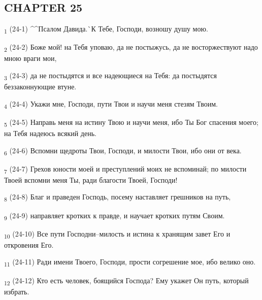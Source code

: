 \subsection{CHAPTER 25}
\begin{tcolorbox}
\textsubscript{1} (24-1) ^^Псалом Давида.^^ К Тебе, Господи, возношу душу мою.
\end{tcolorbox}
\begin{tcolorbox}
\textsubscript{2} (24-2) Боже мой! на Тебя уповаю, да не постыжусь, да не восторжествуют надо мною враги мои,
\end{tcolorbox}
\begin{tcolorbox}
\textsubscript{3} (24-3) да не постыдятся и все надеющиеся на Тебя: да постыдятся беззаконнующие втуне.
\end{tcolorbox}
\begin{tcolorbox}
\textsubscript{4} (24-4) Укажи мне, Господи, пути Твои и научи меня стезям Твоим.
\end{tcolorbox}
\begin{tcolorbox}
\textsubscript{5} (24-5) Направь меня на истину Твою и научи меня, ибо Ты Бог спасения моего; на Тебя надеюсь всякий день.
\end{tcolorbox}
\begin{tcolorbox}
\textsubscript{6} (24-6) Вспомни щедроты Твои, Господи, и милости Твои, ибо они от века.
\end{tcolorbox}
\begin{tcolorbox}
\textsubscript{7} (24-7) Грехов юности моей и преступлений моих не вспоминай; по милости Твоей вспомни меня Ты, ради благости Твоей, Господи!
\end{tcolorbox}
\begin{tcolorbox}
\textsubscript{8} (24-8) Благ и праведен Господь, посему наставляет грешников на путь,
\end{tcolorbox}
\begin{tcolorbox}
\textsubscript{9} (24-9) направляет кротких к правде, и научает кротких путям Своим.
\end{tcolorbox}
\begin{tcolorbox}
\textsubscript{10} (24-10) Все пути Господни--милость и истина к хранящим завет Его и откровения Его.
\end{tcolorbox}
\begin{tcolorbox}
\textsubscript{11} (24-11) Ради имени Твоего, Господи, прости согрешение мое, ибо велико оно.
\end{tcolorbox}
\begin{tcolorbox}
\textsubscript{12} (24-12) Кто есть человек, боящийся Господа? Ему укажет Он путь, который избрать.
\end{tcolorbox}
